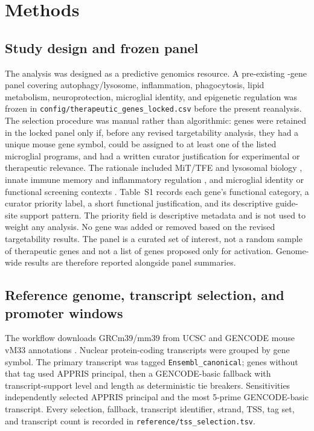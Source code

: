 \documentclass[11pt]{article}
\begin{document}
\section{Methods}

\subsection{Study design and frozen panel}

The analysis was designed as a predictive genomics resource. A pre-existing \NPanel{}-gene panel covering autophagy/lysosome, inflammation, phagocytosis, lipid metabolism, neuroprotection, microglial identity, and epigenetic regulation was frozen in \texttt{config/therapeutic\_genes\_locked.csv} before the present reanalysis. The selection procedure was manual rather than algorithmic: genes were retained in the locked panel only if, before any revised targetability analysis, they had a unique mouse gene symbol, could be assigned to at least one of the listed microglial programs, and had a written curator justification for experimental or therapeutic relevance. The rationale included MiT/TFE and lysosomal biology \citep{sardiello2009gene,settembre2011tfeb,iyer2022lysosomal}, innate immune memory and inflammatory regulation \citep{wendeln2018innate,zhangx2022innate}, and microglial identity or functional screening contexts \citep{gosselin2017environment,drager2022crispri}. Table~S1 records each gene's functional category, a curator priority label, a short functional justification, and its descriptive guide-site support pattern. The priority field is descriptive metadata and is not used to weight any analysis. No gene was added or removed based on the revised targetability results. The panel is a curated set of interest, not a random sample of therapeutic genes and not a list of genes proposed only for activation. Genome-wide results are therefore reported alongside panel summaries.

\subsection{Reference genome, transcript selection, and promoter windows}

The workflow downloads GRCm39/mm39 from UCSC and GENCODE mouse vM33 annotations \citep{frankish2021gencode}. Nuclear protein-coding transcripts were grouped by gene symbol. The primary transcript was tagged \texttt{Ensembl\_canonical}; genes without that tag used APPRIS principal, then a GENCODE-basic fallback with transcript-support level and length as deterministic tie breakers. Sensitivities independently selected APPRIS principal and the most 5-prime GENCODE-basic transcript. Every selection, fallback, transcript identifier, strand, TSS, tag set, and transcript count is recorded in \texttt{reference/tss\_selection.tsv}.
\end{document}
